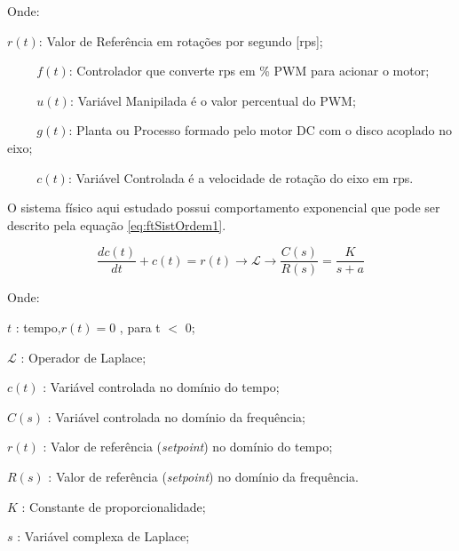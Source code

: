 Onde: 

\hspace{1cm} $r(t)$: Valor de Referência em rotações por segundo [rps];

$\hspace{1cm} f(t)$: Controlador que converte rps em \% PWM para acionar o motor;

$\hspace{1cm} u(t)$: Variável Manipilada é o valor percentual do PWM;

$\hspace{1cm} g(t)$: Planta ou Processo formado pelo motor DC com o disco acoplado no eixo;

$\hspace{1cm}  c(t)$: Variável Controlada é a velocidade de rotação do eixo em rps.




O sistema físico aqui estudado possui comportamento exponencial que pode ser descrito pela equação \ref{eq:ftSistOrdem1}. 






\begin{equation}
	 \frac{d c(t)}{dt} + c(t) = r(t) \rightarrow  \mathscr{L} \to \frac{C(s)}{R(s)} = \frac{K}{s + a} 
\label{eq:ftSistOrdem1}
\end{equation}

Onde:

\setlength{\parindent}{2cm}

$t$ : tempo,$ r(t) = 0$ , para t $<$ 0;

$\mathscr{L}$ : Operador de Laplace;

$c(t)$ : Variável controlada no domínio do tempo;

$C(s)$ : Variável controlada no domínio da frequência;

$r(t)$ : Valor de referência (\emph{setpoint}) no domínio do tempo;

$R(s)$ : Valor de referência (\emph{setpoint}) no domínio da frequência.

$K$ : Constante de proporcionalidade;

$s$ : Variável complexa de Laplace;

